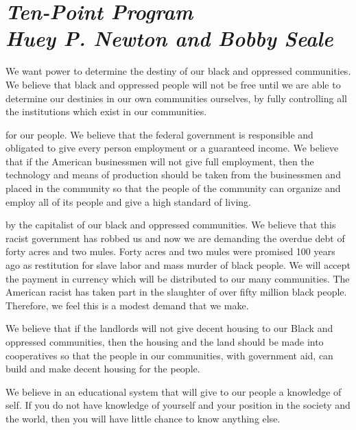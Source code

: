 \documentclass[14pt]{extarticle}
\begin{document}
\raggedright
\section*{\LARGE\sffamily\slshape Ten-Point Program \\ {\large Huey P. Newton and Bobby Seale}}
 {We want power to determine the destiny of our black and oppressed communities.} We believe that black and oppressed people will not be free until we are able to determine our destinies in our own communities ourselves, by fully controlling all the institutions which exist in our communities.


 {for our people.} We believe that the federal government is responsible and obligated to give every person employment or a guaranteed income. We believe that if the American businessmen will not give full employment, then the technology and means of production should be taken from the businessmen and placed in the community so that the people of the community can organize and employ all of its people and give a high standard of living.

 {by the capitalist of our black and oppressed communities.} We believe that this racist government has robbed us and now we are demanding the overdue debt of forty acres and two mules. Forty acres and two mules were promised 100 years ago as restitution for slave labor and mass murder of black people. We will accept the payment in currency which will be distributed to our many communities. The American racist has taken part in the slaughter of over fifty million black people. Therefore, we feel this is a modest demand that we make.

 We believe that if the landlords will not give decent housing to our Black and oppressed communities, then the housing and the land should be made into cooperatives so that the people in our communities, with government aid, can build and make decent housing for the people.


 We believe in an educational system that will give to our people a knowledge of self. If you do not have knowledge of yourself and your position in the society and the world, then you will have little chance to know anything else.
\end{document}
